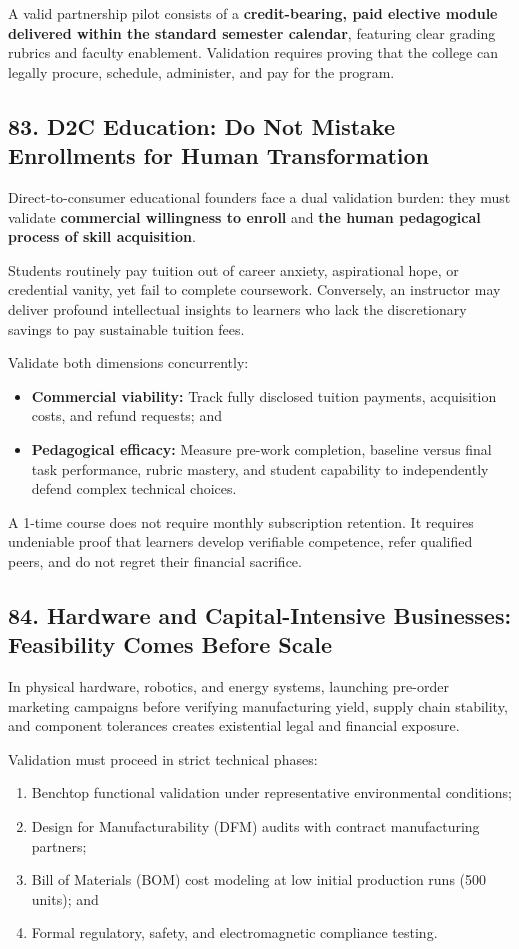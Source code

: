 A valid partnership pilot consists of a \textbf{credit-bearing, paid elective module delivered within the standard semester calendar}, featuring clear grading rubrics and faculty enablement. Validation requires proving that the college can legally procure, schedule, administer, and pay for the program.

\subsection*{83. D2C Education: Do Not Mistake Enrollments for Human Transformation}

Direct-to-consumer educational founders face a dual validation burden: they must validate \textbf{commercial willingness to enroll} and \textbf{the human pedagogical process of skill acquisition}.

Students routinely pay tuition out of career anxiety, aspirational hope, or credential vanity, yet fail to complete coursework. Conversely, an instructor may deliver profound intellectual insights to learners who lack the discretionary savings to pay sustainable tuition fees.

Validate both dimensions concurrently:
\begin{itemize}
    \item \textbf{Commercial viability:} Track fully disclosed tuition payments, acquisition costs, and refund requests; and
    \item \textbf{Pedagogical efficacy:} Measure pre-work completion, baseline versus final task performance, rubric mastery, and student capability to independently defend complex technical choices.
\end{itemize}

A 1-time course does not require monthly subscription retention. It requires undeniable proof that learners develop verifiable competence, refer qualified peers, and do not regret their financial sacrifice.

\subsection*{84. Hardware and Capital-Intensive Businesses: Feasibility Comes Before Scale}

In physical hardware, robotics, and energy systems, launching pre-order marketing campaigns before verifying manufacturing yield, supply chain stability, and component tolerances creates existential legal and financial exposure.

Validation must proceed in strict technical phases:
\begin{enumerate}
    \item Benchtop functional validation under representative environmental conditions;
    \item Design for Manufacturability (DFM) audits with contract manufacturing partners;
    \item Bill of Materials (BOM) cost modeling at low initial production runs (500 units); and
    \item Formal regulatory, safety, and electromagnetic compliance testing.
\end{enumerate}

